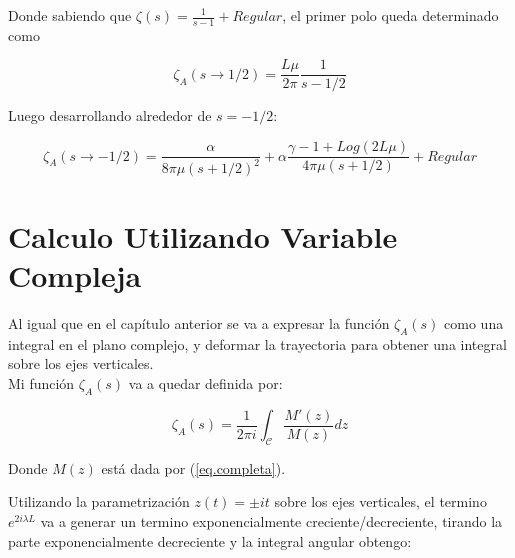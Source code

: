Donde sabiendo que $\zeta(s) = \frac{1}{s-1} + Regular$, el primer polo queda determinado como

\begin{equation}
    \zeta _A (s \rightarrow 1/2) = \frac{L \mu }{2 \pi} \frac{1}{s-1/2}    
\end{equation}

Luego desarrollando alrededor de $s=-1/2$:

\begin{equation}
    \zeta _A (s \rightarrow -1/2 ) =  \frac{\alpha}{8  \pi \mu (s+1/2)^2} +
    \alpha \frac{ \gamma -1 + Log(2L \mu)}{4  \pi \mu (s+1/2)} + 
    Regular
\end{equation}

\section{Calculo Utilizando Variable Compleja}


Al igual que en el capítulo anterior se va a expresar la función $\zeta _A (s)$ como una integral en el plano complejo, y deformar la trayectoria para obtener una integral sobre los ejes verticales. \\

Mi función $ \zeta _A (s) $ va a quedar definida por:

\begin{equation}
\zeta _A (s) = 
\frac{1}{2 \pi i} 
\int _{\mathcal{C}}
\frac{M ' ( z ) }{ M ( z ) } d z
\label{eq.zeta.compleja}
\end{equation}

Donde $M ( z )$ está dada por (\ref{eq.completa}).

Utilizando la parametrización $ z (t) = \pm i t$ sobre los ejes verticales, el termino $e ^{2 i \lambda L}$ va a generar un termino exponencialmente creciente/decreciente, tirando la parte exponencialmente decreciente y la integral angular obtengo:

\begin{comment}

\begin{equation}
\begin{array}{c}
    \zeta _A (s) = \\
     \frac{1}{2 \pi i} \int _{\infty} ^{1}
     \frac{ i \alpha }{2 t^2} 
     \left(
      1 + \frac{i \pi}{2} + Log[2 t] + \psi (1 + \frac{\beta}{2 t})
     \right)
     t ^{-2s}
     e ^{- i \pi s} (i dt) + \\
     \frac{1}{2 \pi i} \int _{\infty} ^{1} 
     \left(
     2 + \frac{\beta}{2 t^2}
     \left(
     1 + \frac{i \pi}{2} - Log[2 t] - \psi (1+ \frac{\beta}{2 t})
     \right)
     t ^{-2s}
     e ^{ i \pi s} (-i dt)
     \right)     
\end{array}
\end{equation}

\end{comment}

